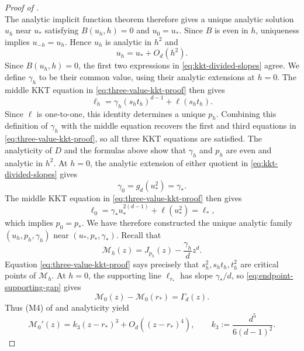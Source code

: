 \begin{proof}[Proof of ]
\[\]
The analytic implicit function theorem therefore gives a unique analytic
solution $u_h$ near $u_*$ satisfying $B(u_h,h)=0$ and $u_0=u_*$.  Since $B$
is even in $h$, uniqueness implies $u_{-h}=u_h$.  Hence $u_h$ is analytic
in $h^2$ and
\[
  u_h=u_*+O_d(h^2).
\]
Since $B(u_h,h)=0$, the first two expressions in
\eqref{eq:kkt-divided-slopes} agree.  We define $\gamma_h$ to be
their common value, using their analytic extensions at $h=0$.  The middle KKT
equation in \eqref{eq:three-value-kkt-proof} then gives
\[
  \ell_h=\gamma_h(s_ht_h)^{d-1}+\ell(s_ht_h).
\]
Since $\ell$ is one-to-one, this identity determines a unique $p_h$.
Combining this definition of $\gamma_h$ with the middle equation recovers the
first and third equations in \eqref{eq:three-value-kkt-proof}, so all three
KKT equations are satisfied.
The analyticity of $D$ and the formulas above show that
$\gamma_h$ and $p_h$ are even and analytic in $h^2$.  At $h=0$,
the analytic extension of either quotient in
\eqref{eq:kkt-divided-slopes} gives
\[
  \gamma_0=g_d(u_*^2)=\gamma_*.
\]
The middle KKT equation in \eqref{eq:three-value-kkt-proof} then gives
\[
  \ell_0=\gamma_*u_*^{2(d-1)}+\ell(u_*^2)=\ell_*,
\]
which implies $p_0=p_*$. 
We have therefore constructed the unique analytic family
$(u_h,p_h,\gamma_h)$ near $(u_*,p_*,\gamma_*)$.
Recall that
\[
  \mathcal M_h(z)=J_{p_h}(z)-\frac{\gamma_h}{d}z^d.
\]
Equation \eqref{eq:three-value-kkt-proof} says precisely that
$s_h^2,s_ht_h,t_h^2$ are critical points of $\mathcal M_h$.
At $h=0$, the supporting line $\ell_{r_*}$ has slope $\gamma_*/d$, so
\eqref{eq:endpoint-supporting-gap} gives
\[
  \mathcal M_0(z)-\mathcal M_0(r_*)=\Gamma_d(z).
\]
Thus (M4) of  and analyticity yield
\begin{equation}\label{eq:mh-cubic-derivative}
  \mathcal M_0'(z)
  =k_3(z-r_*)^3+O_d((z-r_*)^4),
  \qquad
  k_3:=\frac{d^5}{6(d-1)^2}.
\end{equation}


\end{proof}
